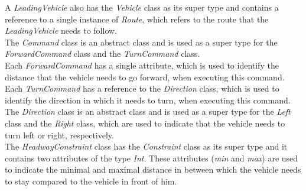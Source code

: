 \documentclass[a4paper,twoside,11pt]{article}
\begin{document}
A \textit{LeadingVehicle} also has the \textit{Vehicle} class as its super type and contains a reference to a single instance of \textit{Route}, which refers to the route that the \textit{LeadingVehicle} needs to follow.\\

The \textit{Command} class is an abstract class and is used as a super type for the \textit{ForwardCommand} class and the \textit{TurnCommand} class.\\

Each \textit{ForwardCommand} has a single attribute, which is used to identify the distance that the vehicle needs to go forward, when executing this command.\\

Each \textit{TurnCommand} has a reference to the \textit{Direction} class, which is used to identify the direction in which it needs to turn, when executing this command.\\

The \textit{Direction} class is an abstract class and is used as a super type for the \textit{Left} class and the \textit{Right} class, which are used to indicate that the vehicle needs to turn left or right, respectively.\\

The \textit{HeadwayConstraint} class has the \textit{Constraint} class as its super type and it contains two attributes of the type \textit{Int}. These attributes (\textit{min} and \textit{max}) are used to indicate the minimal and maximal distance in between which the vehicle needs to stay compared to the vehicle in front of him.\\
\end{document}
